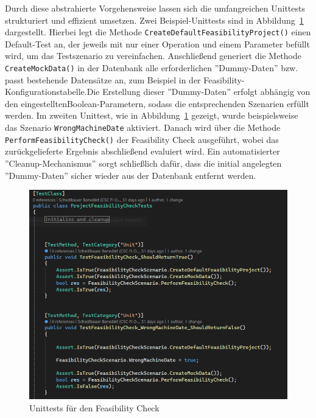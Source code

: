 Durch diese abstrahierte Vorgehensweise lassen sich die umfangreichen Unittests strukturiert und effizient umsetzen. Zwei Beispiel-Unittests sind in Abbildung~\ref{fig:unittestcases} dargestellt. Hierbei legt die Methode \texttt{CreateDefaultFeasibilityProject()} einen Default-Test an, der jeweils mit nur einer Operation und einem Parameter befüllt wird, um das Testszenario zu vereinfachen. Anschließend generiert die Methode \texttt{CreateMockData()} in der Datenbank alle erforderlichen ''Dummy-Daten'' bzw. passt bestehende Datensätze an, zum Beispiel in der Feasibility-Konfigurationstabelle.\linebreak Die Erstellung dieser ''Dummy-Daten'' erfolgt abhängig von den eingestellten\linebreak Boolean-Parametern, sodass die entsprechenden Szenarien erfüllt werden. Im zweiten Unittest, wie in Abbildung~\ref{fig:unittestcases} gezeigt, wurde beispielsweise das Szenario \texttt{WrongMachineDate} aktiviert. Danach wird über die Methode \texttt{PerformFeasibilityCheck()} der Feasibility Check ausgeführt, wobei das zurückgelieferte Ergebnis abschließend evaluiert wird. Ein automatisierter ''Cleanup-Mechanismus'' sorgt schließlich dafür, dass die initial angelegten ''Dummy-Daten'' sicher wieder aus der Datenbank entfernt werden.
\begin{figure}[!htb]
    \centering
    \includegraphics[width=1\textwidth]{bilder/unittestcases.png}
    \caption{Unittests für den Feasibility Check}
    \label{fig:unittestcases}
\end{figure}

